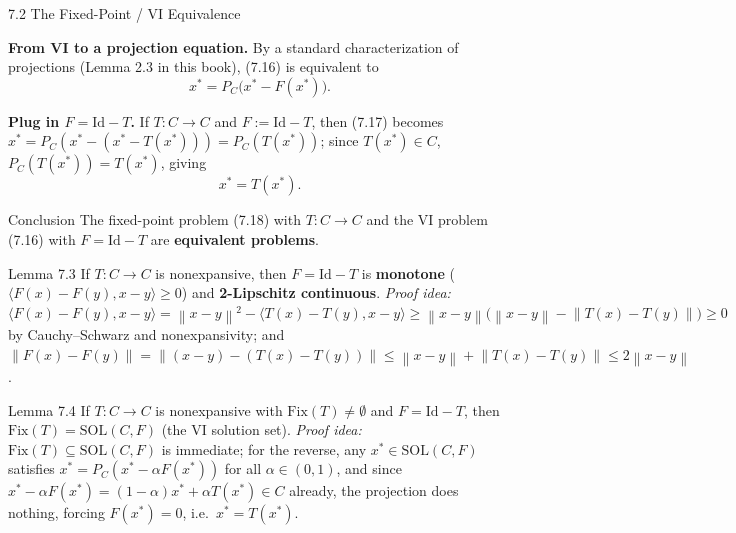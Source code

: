 \documentclass[aspectratio=169,10pt]{beamer}
\newcommand{\inner}[2]{\langle #1, #2 \rangle}
\newcommand{\norm}[1]{\left\|#1\right\|}
\newcommand{\Fix}{\mathrm{Fix}}
\newcommand{\Id}{\mathrm{Id}}
\newcommand{\Sol}{\mathrm{SOL}}
\begin{document}
\begin{frame}{7.2 The Fixed-Point / VI Equivalence}

  \textbf{From VI to a projection equation.} By a standard
  characterization of projections (Lemma 2.3 in this book), (7.16)
  is equivalent to
  \[
    x^* = P_C\bigl(x^*-F(x^*)\bigr). \tag{7.17}
  \]

  \textbf{Plug in $F=\Id-T$.} If $T:C\to C$ and $F:=\Id-T$, then
  (7.17) becomes $x^*=P_C(x^*-(x^*-T(x^*)))=P_C(T(x^*))$; since
  $T(x^*)\in C$, $P_C(T(x^*))=T(x^*)$, giving
  \[
    x^*=T(x^*). \tag{7.18}
  \]

  \begin{block}{Conclusion}
    The fixed-point problem (7.18) with $T:C\to C$ and the VI
    problem (7.16) with $F=\Id-T$ are \textbf{equivalent problems}.
  \end{block}

  \begin{alertblock}{Lemma 7.3}
    If $T:C\to C$ is nonexpansive, then $F=\Id-T$ is
    \textbf{monotone} ($\inner{F(x)-F(y)}{x-y}\ge0$) and
    \textbf{2-Lipschitz continuous}. \emph{Proof idea:}
    $\inner{F(x)-F(y)}{x-y}=\norm{x-y}^2-\inner{T(x)-T(y)}{x-y}
     \ge\norm{x-y}\bigl(\norm{x-y}-\norm{T(x)-T(y)}\bigr)\ge0$ by
    Cauchy--Schwarz and nonexpansivity; and
    $\norm{F(x)-F(y)}=\norm{(x-y)-(T(x)-T(y))}\le\norm{x-y}+\norm{T(x)-T(y)}\le2\norm{x-y}$.
  \end{alertblock}

  \begin{alertblock}{Lemma 7.4}
    If $T:C\to C$ is nonexpansive with $\Fix(T)\neq\emptyset$ and
    $F=\Id-T$, then $\Fix(T)=\Sol(C,F)$ (the VI solution set).
    \emph{Proof idea:} $\Fix(T)\subseteq\Sol(C,F)$ is immediate; for
    the reverse, any $x^*\in\Sol(C,F)$ satisfies
    $x^*=P_C(x^*-\alpha F(x^*))$ for all $\alpha\in(0,1)$, and since
    $x^*-\alpha F(x^*)=(1-\alpha)x^*+\alpha T(x^*)\in C$ already, the
    projection does nothing, forcing $F(x^*)=0$, i.e.\ $x^*=T(x^*)$.
  \end{alertblock}

\end{frame}
\end{document}

